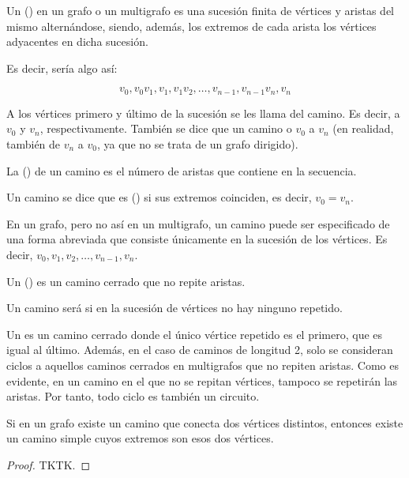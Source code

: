 



\begin{deffinition}[Camino]
  Un  () en un grafo o un multigrafo es una sucesión
  finita de vértices y aristas del mismo alternándose, siendo, además, los
  extremos de cada arista los vértices adyacentes en dicha sucesión.
\end{deffinition}

Es decir, sería algo así:

$$ v_0, v_0v_1, v_1, v_1v_2, \ldots, v_{n-1}, v_{n-1}v_n, v_n $$

A los vértices primero y último de la sucesión se les llama  del
camino. Es decir, a $v_0$ y $v_n$, respectivamente. También se dice que un
camino  o  $v_0$ a $v_n$ (en realidad, también de $v_n$
a $v_0$, ya que no se trata de un grafo dirigido).

La  () de un camino es el número de aristas que
contiene en la secuencia.

Un camino se dice que es  () si sus extremos
coinciden, es decir, $v_0 = v_n$.

En un grafo, pero no así en un multigrafo, un camino puede ser especificado
de una forma abreviada que consiste únicamente en la sucesión de los
vértices. Es decir, $v_0, v_1, v_2, \ldots, v_{n-1}, v_n$.

Un  () es un camino cerrado que no repite aristas.

Un camino será  si en la sucesión de vértices no hay ninguno
repetido.

Un  es un camino cerrado donde el único vértice repetido es el
primero, que es igual al último. Además, en el caso de caminos de longitud
2, solo se consideran ciclos a aquellos caminos cerrados en multigrafos que
no repiten aristas. Como es evidente, en un camino en el que no se repitan
vértices, tampoco se repetirán las aristas. Por tanto, todo ciclo es también
un circuito.

\begin{theorem}
  Si en un grafo existe un camino que conecta dos vértices distintos,
  entonces existe un camino simple cuyos extremos son esos dos vértices.
\end{theorem}

\begin{proof}
  TKTK.








\end{proof}

